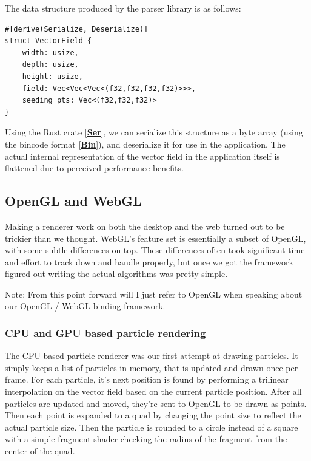 \documentclass{article}
\newcommand{\code}[1]{\fcolorbox{codebd}{codebg}{\lstinline[basicstyle=\ttfamily\color{codefg}]{#1}}}
\newcommand{\reference}[1]{[\hyperref[ref:#1]{\textbf{#1}}]}
\begin{document}
The data structure produced by the parser library is as follows:

\begin{verbatim}
#[derive(Serialize, Deserialize)]
struct VectorField {
    width: usize,
    depth: usize,
    height: usize,
    field: Vec<Vec<Vec<(f32,f32,f32,f32)>>>,
    seeding_pts: Vec<(f32,f32,f32)>
}
\end{verbatim}

Using the Rust crate \code{serde} \reference{Ser}, we can serialize this structure as a byte array (using the bincode format \reference{Bin}), and deserialize it for use in the application. The actual internal representation of the vector field in the application itself is flattened due to perceived performance benefits.

\subsection*{OpenGL and WebGL}

Making a renderer work on both the desktop and the web turned out to be trickier than we thought. WebGL's feature set is essentially a subset of OpenGL, with some subtle differences on top. These differences often took significant time and effort to track down and handle properly, but once we got the framework figured out writing the actual algorithms was pretty simple.

Note: From this point forward will I just refer to OpenGL when speaking about our OpenGL / WebGL binding framework.

\subsubsection*{CPU and GPU based particle rendering}

The CPU based particle renderer was our first attempt at drawing particles. It simply keeps a list of particles in memory, that is updated and drawn once per frame. For each particle, it's next position is found by performing a trilinear interpolation on the vector field based on the current particle position. After all particles are updated and moved, they're sent to OpenGL to be drawn as points. Then each point is expanded to a quad by changing the point size to reflect the actual particle size. Then the particle is rounded to a circle instead of a square with a simple fragment shader checking the radius of the fragment from the center of the quad.
\end{document}
